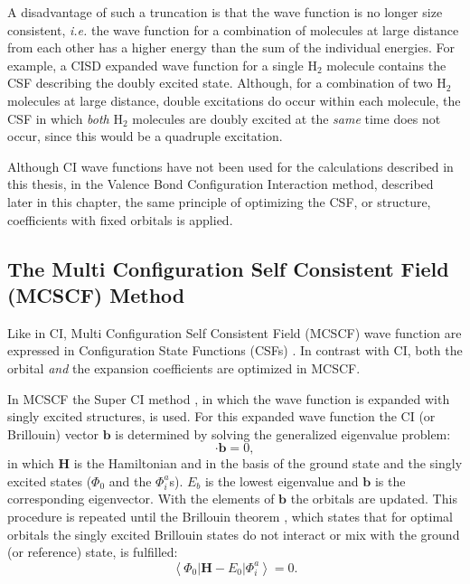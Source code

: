 A disadvantage of such a truncation is that the wave function is no longer size consistent, \textit{i.e.} the wave function for a combination of molecules at large distance from each other has a higher energy than the sum of the individual energies. For example, a CISD expanded wave function for a single H$_2$ molecule contains the CSF describing the doubly excited state. Although, for a combination of two H$_2$ molecules at large distance, double excitations do occur within each molecule, the CSF in which \textit{both} H$_2$ molecules are doubly excited at the \textit{same} time does not occur, since this would be a quadruple excitation.

Although CI wave functions have not been used for the calculations described in this thesis, in the Valence Bond Configuration Interaction method, described later in this chapter, the same principle of optimizing the CSF, or structure, coefficients with fixed orbitals is applied.

\subsection{\label{ch1.sec.mcscf}The Multi Configuration Self Consistent Field (MCSCF) Method}
Like in CI, Multi Configuration Self Consistent Field (MCSCF) wave function are expressed in Configuration State Functions (CSFs) \cite{wahldasbook,daswahl}. In contrast with CI, both the orbital \textit{and} the expansion coefficients are optimized in MCSCF.

In MCSCF the Super CI method \cite{superci1,superci2}, in which the wave function is expanded with singly excited structures, is used. For this expanded wave function the CI (or Brillouin) vector $\mathbf{b}$ is determined by solving the generalized eigenvalue problem:
\begin{equation}
[\mathbf{H}-E_b] \cdot \mathbf{b} = 0,
\label{ch1.eq.geig}
\end{equation}
in which $\mathbf{H}$ is the Hamiltonian and in the basis of the ground state and the singly excited states ($\Phi_0$ and the $\Phi_{i}^{a}$s). $E_b$ is the lowest eigenvalue and $\mathbf{b}$ is the corresponding eigenvector. With the elements of $\mathbf{b}$ the orbitals are updated. This procedure is repeated until the Brillouin theorem \cite{brillouin}, which states that for optimal orbitals the singly excited Brillouin states do not interact or mix with the ground (or reference) state, is fulfilled:
\begin{equation}
\left < \Phi_0 | \mathbf{H} - E_0 | \Phi_{i}^{a} \right > = 0.
\label{ch1.eq.brillouin}
\end{equation}

